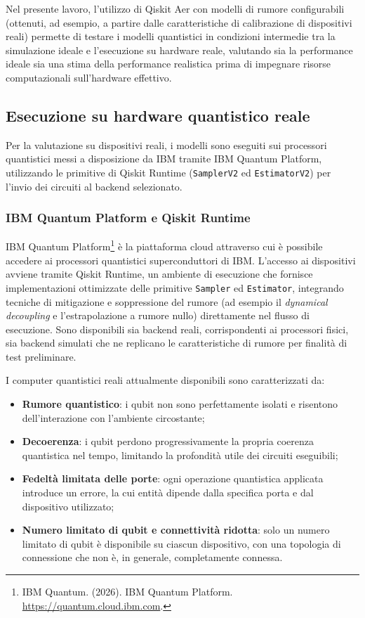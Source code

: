 Nel presente lavoro, l'utilizzo di Qiskit Aer con modelli di rumore configurabili (ottenuti, ad esempio, a partire dalle caratteristiche di calibrazione di dispositivi reali) permette di testare i modelli quantistici in condizioni intermedie tra la simulazione ideale e l'esecuzione su hardware reale, valutando sia la performance ideale sia una stima della performance realistica prima di impegnare risorse computazionali sull'hardware effettivo.

\subsection{Esecuzione su hardware quantistico reale}
\label{sec:esecuzione_hardware_reale}

Per la valutazione su dispositivi reali, i modelli sono eseguiti sui processori quantistici messi a disposizione da IBM tramite IBM Quantum Platform, utilizzando le primitive di Qiskit Runtime (\texttt{SamplerV2} ed \texttt{EstimatorV2}) per l'invio dei circuiti al backend selezionato.

\subsubsection{IBM Quantum Platform e Qiskit Runtime}
IBM Quantum Platform\footnote{IBM Quantum. (2026). IBM Quantum Platform. \url{https://quantum.cloud.ibm.com}.} è la piattaforma cloud attraverso cui è possibile accedere ai processori quantistici superconduttori di IBM. L'accesso ai dispositivi avviene tramite Qiskit Runtime, un ambiente di esecuzione che fornisce implementazioni ottimizzate delle primitive \texttt{Sampler} ed \texttt{Estimator}, integrando tecniche di mitigazione e soppressione del rumore (ad esempio il \textit{dynamical decoupling} e l'estrapolazione a rumore nullo) direttamente nel flusso di esecuzione. Sono disponibili sia backend reali, corrispondenti ai processori fisici, sia backend simulati che ne replicano le caratteristiche di rumore per finalità di test preliminare.

I computer quantistici reali attualmente disponibili sono caratterizzati da:
\begin{itemize}
    \item \textbf{Rumore quantistico}: i qubit non sono perfettamente isolati e risentono dell'interazione con l'ambiente circostante;
    \item \textbf{Decoerenza}: i qubit perdono progressivamente la propria coerenza quantistica nel tempo, limitando la profondità utile dei circuiti eseguibili;
    \item \textbf{Fedeltà limitata delle porte}: ogni operazione quantistica applicata introduce un errore, la cui entità dipende dalla specifica porta e dal dispositivo utilizzato;
    \item \textbf{Numero limitato di qubit e connettività ridotta}: solo un numero limitato di qubit è disponibile su ciascun dispositivo, con una topologia di connessione che non è, in generale, completamente connessa.
\end{itemize}

